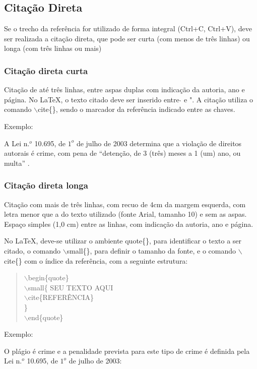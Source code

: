 \subsection{Citação Direta}
Se o trecho da referência for utilizado de forma integral (Ctrl+C, Ctrl+V), deve ser realizada a citação direta, que pode ser curta (com menos de três linhas) ou longa (com três linhas ou mais)

\subsubsection{Citação direta curta}
Citação de até três linhas, entre aspas duplas com indicação da autoria, ano e página. No LaTeX, o texto citado deve ser inserido entre $\grave{}\grave{}$ e ". A citação utiliza o comando $\backslash$cite\{\}, sendo o marcador da referência indicado entre as chaves.

Exemplo:

A Lei n.$^o$ 10.695, de $1^o$ de julho de 2003 determina que a violação de direitos autorais é crime, com pena de ``detenção, de 3 (três) meses a 1 (um) ano, ou multa''  \cite{lei10695}.

\subsubsection{Citação direta longa}
Citação com mais de três linhas, com recuo de 4cm da margem esquerda, com letra menor que a do texto utilizado (fonte Arial, tamanho 10) e sem as aspas. Espaço simples (1,0 cm) entre as linhas, com indicação da autoria, ano e página.

No LaTeX, deve-se utilizar o ambiente quote\{\}, para identificar o texto a ser citado, o comando  $\backslash$small\{\}, para definir o tamanho da fonte, e o comando $\backslash$cite\{\} com o índice da referência, com a seguinte estrutura:\\
\begin{quote}
$\backslash$begin\{quote\}\\
$\backslash$small\{ SEU TEXTO AQUI \\
$\backslash$cite\{REFERÊNCIA\}\\
\}\\
$\backslash$end\{quote\}\\
\end{quote}

Exemplo:

O plágio é crime e a penalidade prevista para este tipo de crime é definida pela Lei n.$^o$ 10.695, de $1^o$ de julho de 2003:

